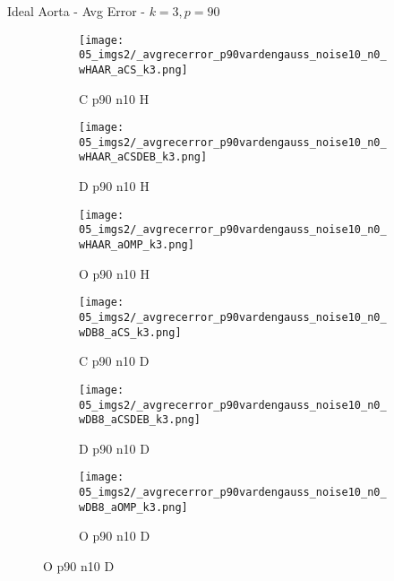 \begin{frame}{Ideal Aorta - Avg Error - $k=3,p=90$}{}
\begin{figure}
\begin{subfigure}{0.13\textwidth}
\texttt{[image: 05\_imgs2/\_avgrecerror\_p90vardengauss\_noise10\_n0\_wHAAR\_aCS\_k3.png]}
\caption*{\tiny C p90 n10 H}
\end{subfigure}
\begin{subfigure}{0.13\textwidth}
\texttt{[image: 05\_imgs2/\_avgrecerror\_p90vardengauss\_noise10\_n0\_wHAAR\_aCSDEB\_k3.png]}
\caption*{\tiny D p90 n10 H}
\end{subfigure}
\begin{subfigure}{0.13\textwidth}
\texttt{[image: 05\_imgs2/\_avgrecerror\_p90vardengauss\_noise10\_n0\_wHAAR\_aOMP\_k3.png]}
\caption*{\tiny O p90 n10 H}
\end{subfigure}
\begin{subfigure}{0.13\textwidth}
\texttt{[image: 05\_imgs2/\_avgrecerror\_p90vardengauss\_noise10\_n0\_wDB8\_aCS\_k3.png]}
\caption*{\tiny C p90 n10 D}
\end{subfigure}
\begin{subfigure}{0.13\textwidth}
\texttt{[image: 05\_imgs2/\_avgrecerror\_p90vardengauss\_noise10\_n0\_wDB8\_aCSDEB\_k3.png]}
\caption*{\tiny D p90 n10 D}
\end{subfigure}
\begin{subfigure}{0.13\textwidth}
\texttt{[image: 05\_imgs2/\_avgrecerror\_p90vardengauss\_noise10\_n0\_wDB8\_aOMP\_k3.png]}
\caption*{\tiny O p90 n10 D}
\end{subfigure}

\vspace{5pt}


\end{figure}
\end{frame}

